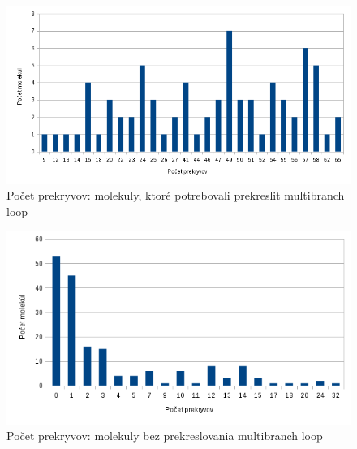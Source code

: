 \begin{figure}
  \includegraphics[width=1\textwidth]{../img/statistika/prekryvy-pocetmolekul-s-rotaciami}
  \caption{Počet prekryvov: molekuly, ktoré potrebovali prekreslit multibranch loop}
  \label{obr:statistika_prekryvy_bez_rotácii}
\end{figure}


\begin{figure}
  \includegraphics[width=1\textwidth]{../img/statistika/prekryvy-pocetmolekul-bez-rotacii}
  \caption{Počet prekryvov: molekuly bez prekreslovania multibranch loop}
  \label{obr:statistika_prekryvy_s_rotaciami}
\end{figure}

